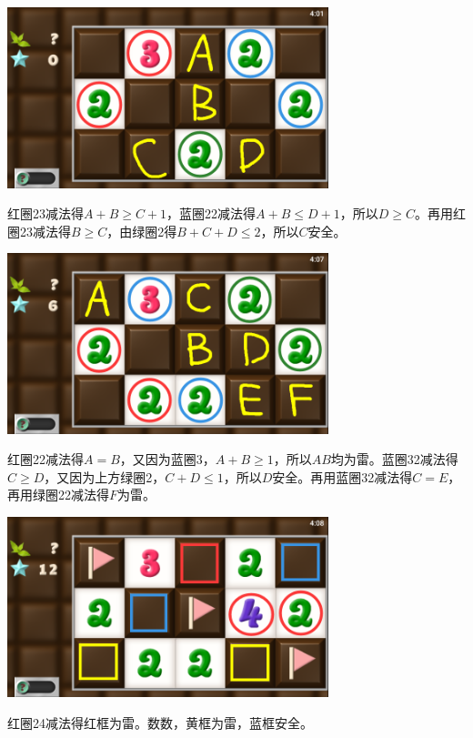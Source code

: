 \subsection{} %
\begin{center}
    \includegraphics[width=0.7\textwidth]{puzzle/100-1.png}
\end{center}
红圈23减法得$A+B\ge C+1$，蓝圈22减法得$A+B\le D+1$，所以$D\ge C$。再用红圈23减法得$B\ge C$，由绿圈2得$B+C+D\le 2$，所以$C$安全。
\begin{center}
    \includegraphics[width=0.7\textwidth]{puzzle/100-2.png}
\end{center}
红圈22减法得$A=B$，又因为蓝圈3，$A+B\ge 1$，所以$AB$均为雷。蓝圈32减法得$C\ge D$，又因为上方绿圈2，$C+D\le 1$，所以$D$安全。再用蓝圈32减法得$C=E$，再用绿圈22减法得$F$为雷。
\begin{center}
    \includegraphics[width=0.7\textwidth]{puzzle/100-3.png}
\end{center}
红圈24减法得红框为雷。数数，黄框为雷，蓝框安全。

